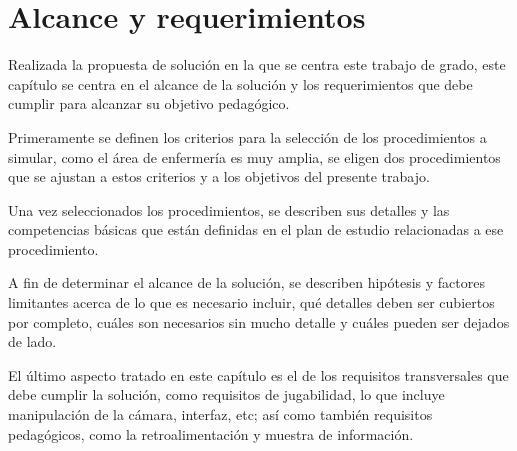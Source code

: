\chapter{Alcance y requerimientos}
\label{chap:requerimientos}


Realizada la propuesta de solución en la que se centra este trabajo de grado, este capítulo
se centra en el alcance de la solución y los requerimientos que debe cumplir para
alcanzar su objetivo pedagógico.

Primeramente se definen los criterios para la selección de los procedimientos
a simular, como el área de enfermería es muy amplia, se eligen dos procedimientos
que se ajustan a estos criterios y a los objetivos del presente trabajo.

Una vez seleccionados los procedimientos, se describen sus detalles y 
las competencias básicas que están definidas en el plan de 
estudio relacionadas a ese procedimiento. 

A fin de determinar el alcance de la solución, se describen hipótesis y factores 
limitantes acerca de
lo que es necesario incluir, qué detalles deben ser cubiertos por completo,
cuáles son necesarios sin mucho detalle y cuáles pueden ser dejados de lado. 

El último aspecto tratado en este capítulo es el de los requisitos transversales
que debe cumplir la solución, como requisitos de jugabilidad, lo que incluye manipulación de
la cámara, interfaz, etc; así como también requisitos pedagógicos, como la
retroalimentación y muestra de información.





